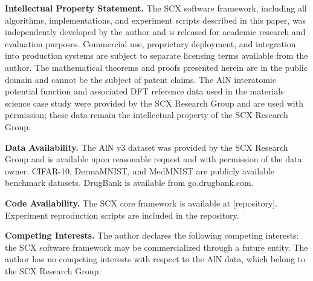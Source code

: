 \documentclass[twocolumn]{article}
\theoremstyle{definition}
\begin{document}
\textbf{Intellectual Property Statement.}
The SCX software framework, including all algorithms, implementations, and experiment scripts described in this paper, was independently developed by the author and is released for academic research and evaluation purposes. Commercial use, proprietary deployment, and integration into production systems are subject to separate licensing terms available from the author. The mathematical theorems and proofs presented herein are in the public domain and cannot be the subject of patent claims. The AlN interatomic potential function and associated DFT reference data used in the materials science case study were provided by the SCX Research Group and are used with permission; these data remain the intellectual property of the SCX Research Group.

\textbf{Data Availability.}
The AlN v3 dataset was provided by the SCX Research Group and is available upon reasonable request and with permission of the data owner. CIFAR-10, DermaMNIST, and MedMNIST are publicly available benchmark datasets. DrugBank is available from go.drugbank.com.

\textbf{Code Availability.}
The SCX core framework is available at [repository]. Experiment reproduction scripts are included in the repository.

\textbf{Competing Interests.}
The author declares the following competing interests: the SCX software framework may be commercialized through a future entity. The author has no competing interests with respect to the AlN data, which belong to the SCX Research Group.
\end{document}
